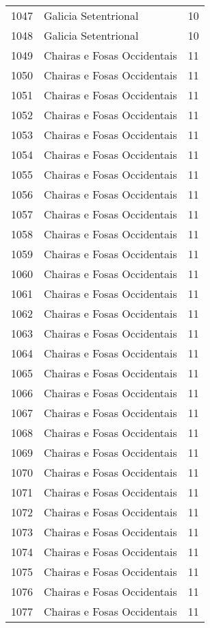 \begin{table}[p]
\begin{tabular}{rlr}
  1047 & Galicia Setentrional &  10 \\ 
  1048 & Galicia Setentrional &  10 \\ 
  1049 & Chairas e Fosas Occidentais &  11 \\ 
  1050 & Chairas e Fosas Occidentais &  11 \\ 
  1051 & Chairas e Fosas Occidentais &  11 \\ 
  1052 & Chairas e Fosas Occidentais &  11 \\ 
  1053 & Chairas e Fosas Occidentais &  11 \\ 
  1054 & Chairas e Fosas Occidentais &  11 \\ 
  1055 & Chairas e Fosas Occidentais &  11 \\ 
  1056 & Chairas e Fosas Occidentais &  11 \\ 
  1057 & Chairas e Fosas Occidentais &  11 \\ 
  1058 & Chairas e Fosas Occidentais &  11 \\ 
  1059 & Chairas e Fosas Occidentais &  11 \\ 
  1060 & Chairas e Fosas Occidentais &  11 \\ 
  1061 & Chairas e Fosas Occidentais &  11 \\ 
  1062 & Chairas e Fosas Occidentais &  11 \\ 
  1063 & Chairas e Fosas Occidentais &  11 \\ 
  1064 & Chairas e Fosas Occidentais &  11 \\ 
  1065 & Chairas e Fosas Occidentais &  11 \\ 
  1066 & Chairas e Fosas Occidentais &  11 \\ 
  1067 & Chairas e Fosas Occidentais &  11 \\ 
  1068 & Chairas e Fosas Occidentais &  11 \\ 
  1069 & Chairas e Fosas Occidentais &  11 \\ 
  1070 & Chairas e Fosas Occidentais &  11 \\ 
  1071 & Chairas e Fosas Occidentais &  11 \\ 
  1072 & Chairas e Fosas Occidentais &  11 \\ 
  1073 & Chairas e Fosas Occidentais &  11 \\ 
  1074 & Chairas e Fosas Occidentais &  11 \\ 
  1075 & Chairas e Fosas Occidentais &  11 \\ 
  1076 & Chairas e Fosas Occidentais &  11 \\ 
  1077 & Chairas e Fosas Occidentais &  11 \\ 

\end{tabular}
\end{table}
